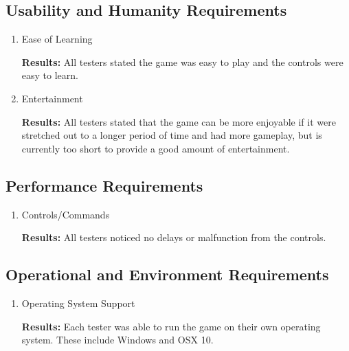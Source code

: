 \documentclass[12pt, titlepage]{article}
\begin{document}
\subsection{Usability and Humanity Requirements}

\begin{enumerate}

\item{Ease of Learning\\}

\textbf{Results: }All testers stated the game was easy to play and the controls were easy to learn.


\item{Entertainment\\}

\textbf{Results:} All testers stated that the game can be more enjoyable if it were stretched out to a longer period of time and had more gameplay, but is currently too short to provide a good amount of entertainment.

\end{enumerate}

\subsection{Performance Requirements}

\begin{enumerate}

\item{Controls/Commands\\}

\textbf{Results:} All testers noticed no delays or malfunction from the controls.

\end{enumerate}

\subsection{Operational and Environment Requirements}

\begin{enumerate}

\item{Operating System Support\\}

\textbf{Results:} Each tester was able to run the game on their own operating system. These include Windows and OSX 10.

\end{enumerate}
\end{document}
